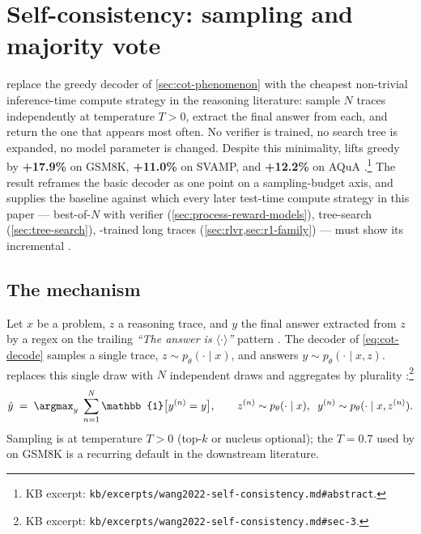 
\section{Self-consistency: sampling and majority vote}
\label{sec:self-consistency}

\citet{wang2022-self-consistency} replace the greedy decoder of
\cref{sec:cot-phenomenon} with the cheapest non-trivial inference-time
compute strategy in the reasoning literature: sample $N$ 
traces independently at temperature $T > 0$, extract the final answer
from each, and return the one that appears most often. No verifier is
trained, no search tree is expanded, no model parameter is changed.
Despite this minimality,  lifts greedy  by
\textbf{+17.9\%} on GSM8K, \textbf{+11.0\%} on SVAMP, and \textbf{+12.2\%}
on AQuA \citep[abstract]{wang2022-self-consistency}.\footnote{KB excerpt:
\nolinkurl{kb/excerpts/wang2022-self-consistency.md#abstract}.} The
result reframes the basic  decoder as one point on a sampling-budget
axis, and supplies the baseline against which every later test-time
compute strategy in this paper — best-of-$N$ with verifier
(\cref{sec:process-reward-models}), tree-search (\cref{sec:tree-search}),
-trained long traces (\cref{sec:rlvr,sec:r1-family}) — must show
its incremental .

\subsection{The mechanism}
\label{sec:sc-mechanism}

Let $x$ be a problem, $z$ a reasoning trace, and $y$ the final answer
extracted from $z$ by a regex on the trailing \textit{``The answer is
$\langle\cdot\rangle$''} pattern \citep[\S 3.1]{wei2022-cot}. The 
decoder of \cref{eq:cot-decode} samples a single trace, $z \sim
p_\theta(\cdot \mid x)$, and answers $y \sim p_\theta(\cdot \mid x, z)$.
 replaces this single draw with $N$ independent draws
and aggregates by plurality
\citep[\S 3]{wang2022-self-consistency}:\footnote{KB excerpt:
\nolinkurl{kb/excerpts/wang2022-self-consistency.md#sec-3}.}
\begin{equation}
  \hat y \;=\; \argmax_y \; \sum_{n=1}^N \mathbb{1}\bigl[y^{(n)} = y\bigr],
  \qquad
  z^{(n)} \sim p_\theta(\cdot \mid x), \;\;
  y^{(n)} \sim p_\theta(\cdot \mid x, z^{(n)}).
  \label{eq:self-consistency}
\end{equation}
Sampling is at temperature $T > 0$ (top-$k$ or nucleus optional);
the  $T = 0.7$ used by \citet[\S 4.1]{wang2022-self-consistency}
on GSM8K is a recurring default in the downstream literature.

